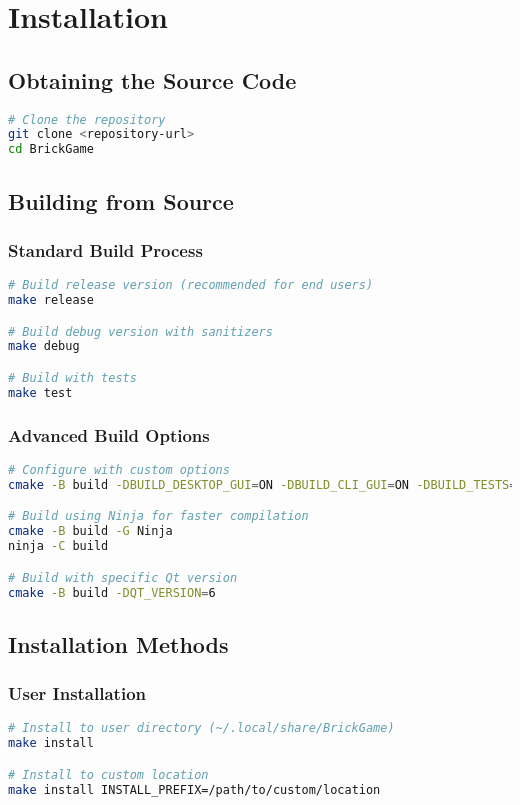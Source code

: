 \documentclass[12pt]{article}
\begin{document}
\section{Installation}

\subsection{Obtaining the Source Code}
\begin{lstlisting}[language=bash]
# Clone the repository
git clone <repository-url>
cd BrickGame
\end{lstlisting}

\subsection{Building from Source}

\subsubsection{Standard Build Process}
\begin{lstlisting}[language=bash]
# Build release version (recommended for end users)
make release

# Build debug version with sanitizers
make debug

# Build with tests
make test
\end{lstlisting}

\subsubsection{Advanced Build Options}
\begin{lstlisting}[language=bash]
# Configure with custom options
cmake -B build -DBUILD_DESKTOP_GUI=ON -DBUILD_CLI_GUI=ON -DBUILD_TESTS=OFF

# Build using Ninja for faster compilation
cmake -B build -G Ninja
ninja -C build

# Build with specific Qt version
cmake -B build -DQT_VERSION=6
\end{lstlisting}

\subsection{Installation Methods}

\subsubsection{User Installation}
\begin{lstlisting}[language=bash]
# Install to user directory (~/.local/share/BrickGame)
make install

# Install to custom location
make install INSTALL_PREFIX=/path/to/custom/location
\end{lstlisting}
\end{document}
